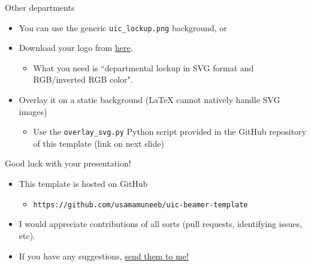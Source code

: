 \documentclass{beamer}
\newcommand{\hrefcol}[2]{\textcolor{uihteal}{\href{#1}{#2}}}
\begin{document}
\begin{frame}[fragile]{Other departments}
\begin{itemize}
\item You can use the generic \verb|uic_lockup.png| background, or
\item Download your logo from \hrefcol{https://marketing.uic.edu/marketing-toolbox/university-style-guide/university-marks-logos/}{here}.
    \begin{itemize}
    \item What you need is ``departmental lockup in SVG format and RGB/inverted RGB color".
    \end{itemize}
\item Overlay it on a static background (LaTeX cannot natively handle SVG images)
    \begin{itemize}
    \item Use the \verb|overlay_svg.py| Python script provided in the GitHub repository of this template (link on next slide)
    \end{itemize}
\end{itemize}
\end{frame}


\begin{frame}[fragile]{Good luck with your presentation!}
\begin{itemize}
\item This template is hosted on GitHub
    \begin{itemize}
    \item  \verb|https://github.com/usamamuneeb/uic-beamer-template|
    \end{itemize}
\item  I would appreciate contributions of all sorts (pull requests, identifying issues, etc).
\item  If you have any suggestions,
\hrefcol{mailto:umunee2@uic.edu}{send them to me!}
\end{itemize}
\end{frame}


\backmatter
\end{document}

